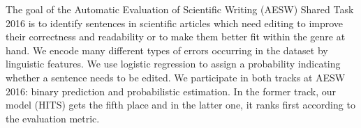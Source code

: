 The goal of the Automatic Evaluation of Scientific Writing (AESW) Shared Task 2016 is to identify sentences in scientific articles which need editing to improve their correctness and readability or to make them better fit within the genre at hand. We encode many different types of errors occurring in the dataset by linguistic features. We use logistic regression to assign a probability indicating whether a sentence needs to be edited. We participate in both tracks at AESW 2016: binary prediction and probabilistic estimation. In the former track, our model (HITS) gets the fifth place and in the latter one, it ranks first according to the evaluation metric.
